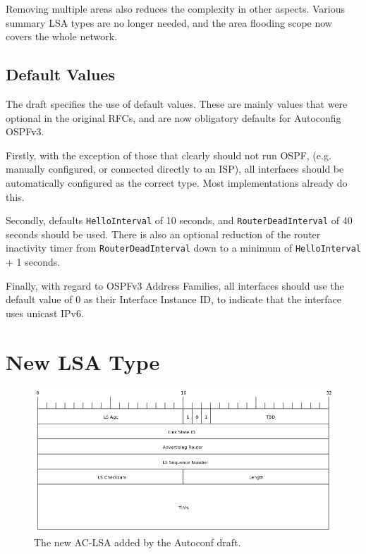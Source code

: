 Removing multiple areas also reduces the complexity in other aspects. Various
summary LSA types are no longer needed, and the area flooding scope now covers
the whole network.

\subsection{Default Values}
The draft specifies the use of default values. These are mainly values that were
optional in the original RFCs, and are now obligatory defaults for Autoconfig
OSPFv3\@. 

Firstly, with the exception of those that clearly should not run OSPF, (e.g.\@
manually configured, or connected directly to an ISP), all interfaces
should be automatically configured as the correct type. Most implementations
already do this. 

Secondly, defaults \texttt{HelloInterval} of 10 seconds, and
\texttt{RouterDeadInterval} of 40 seconds should be used. There is also an
optional reduction of the router inactivity timer from
\texttt{RouterDeadInterval} down to a minimum of \texttt{HelloInterval} + 1
seconds. 

Finally, with regard to OSPFv3 Address Families, all interfaces should use the
default value of 0 as their Interface Instance ID\@, to indicate that the
interface uses unicast IPv6.  

\section{New LSA Type}
\begin{figure}
\begin{center}
	\includegraphics[width=\linewidth]{../Diagrams/Packets/ac_lsa.png}
	\caption{The new AC-LSA added by the Autoconf draft.}\label{fig:AC-LSA}
\end{center}
\end{figure}

